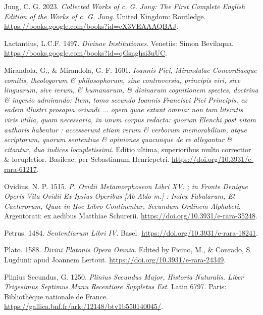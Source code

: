 \documentclass[
]{article}
\newlength{\cslhangindent}
\newlength{\cslentryspacingunit} %
\newenvironment{CSLReferences}[2] %
 {%
  \setlength{\parindent}{0pt}
  \ifodd #1
  \let\oldpar\par
  \def\par{\hangindent=\cslhangindent\oldpar}
  \fi
  \setlength{\parskip}{#2\cslentryspacingunit}
 }%
 {}
\begin{document}
\begin{CSLReferences}{1}{0}
\leavevmode{}%
Jung, C. G. 2023. \emph{Collected Works of c. G. Jung: The First
Complete English Edition of the Works of c. G. Jung}. United Kingdom:
Routledge. \url{https://books.google.com/books?id=cX3VEAAAQBAJ}.

\leavevmode{}%
Lactantius, L.C.F. 1497. \emph{Divinae Institutiones}. Venetiis: Simon
Bevilaqua. \url{https://books.google.com/books?id=qGsnghsi3uUC}.

\leavevmode{}%
Mirandola, G., \& Mirandola, G. F. 1601. \emph{{Ioannis Pici, Mirandulae
Concordiaeque comitis, theologorum \& philosophorum, sine controversia,
principis viri, sive linguarum, sive rerum, \& humanarum, \& divinarum
cognitionem spectes, doctrina \& ingenio admirando: Item, tomo secundo
Ioannis Francisci Pici Principis, ex eadem illustri prosapia oriundi ...
opera quae extant omnia: non tam literatis viris utilia, quam
necessaria, in unum corpus redacta: quorum Elenchi post vitam authoris
habentur : accesserunt etiam rerum \& verborum memorabilium, atque
scriptorum, quorum sententiae \& opiniones quacunque de re allegantur \&
citantur, duo indices locupletissimi}}. {Editio ultima, superioribus
multo correctior \& locupletior}. Basileae: per Sebastianum Henricpetri.
\url{https://doi.org/10.3931/e-rara-61217}.

\leavevmode{}%
Ovidius, N. P. 1515. \emph{P. Ovidii Metamorphoseon Libri XV: ; in
Fronte Denique Operis Vita Ovidii Ex Ipsius Operibus {[}Ab Aldo m.{]} :
Index Fabularum, Et Caeterorum, Quae in Hoc Libro Continentur, Secundum
Ordinem Alphabeti}. {Argentorati}: {ex aedibus Matthiae Schurerii}.
\url{https://doi.org/10.3931/e-rara-35248}.

\leavevmode{}%
Petrus. 1484. \emph{Sententiarum Libri IV}. Basel.
\url{https://doi.org/10.3931/e-rara-18241}.

\leavevmode{}%
Plato. 1588. \emph{{Divini Platonis Opera Omnia}}. Edited by Ficino, M.,
\& Conrado, S. Lugduni: apud Joannem Lertout.
\url{https://doi.org/10.3931/e-rara-24349}.

\leavevmode{}%
Plinius Secundus, G. 1250. \emph{Plinius Secundus Major, Historia
Naturalis. Liber Trigesimus Septimus Manu Recentiore Suppletus Est}.
Latin 6797. Paris: Bibliothèque nationale de France.
\url{https://gallica.bnf.fr/ark:/12148/btv1b550140045/}.


\end{CSLReferences}
\end{document}
